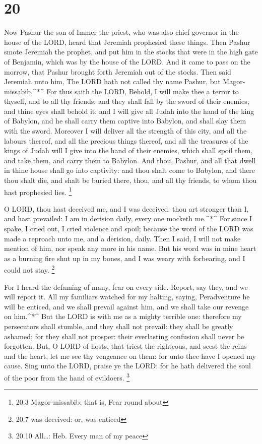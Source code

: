 \hypertarget{section-19}{%
\section{20}\label{section-19}}

 Now Pashur the son of Immer the priest, who was also chief
governor in the house of the LORD, heard that Jeremiah prophesied these
things.  Then Pashur smote Jeremiah the prophet, and put him
in the stocks that were in the high gate of Benjamin, which was by the
house of the LORD.  And it came to pass on the morrow, that
Pashur brought forth Jeremiah out of the stocks. Then said Jeremiah unto
him, The LORD hath not called thy name Pashur, but
Magor-missabib.\^{}*\^{}  For thus saith the LORD, Behold, I
will make thee a terror to thyself, and to all thy friends: and they
shall fall by the sword of their enemies, and thine eyes shall behold
it: and I will give all Judah into the hand of the king of Babylon, and
he shall carry them captive into Babylon, and shall slay them with the
sword.  Moreover I will deliver all the strength of this
city, and all the labours thereof, and all the precious things thereof,
and all the treasures of the kings of Judah will I give into the hand of
their enemies, which shall spoil them, and take them, and carry them to
Babylon.  And thou, Pashur, and all that dwell in thine
house shall go into captivity: and thou shalt come to Babylon, and there
thou shalt die, and shalt be buried there, thou, and all thy friends, to
whom thou hast prophesied lies. \footnote{20.3 Magor-missabib: that is,
  Fear round about}

 O LORD, thou hast deceived me, and I was deceived: thou art
stronger than I, and hast prevailed: I am in derision daily, every one
mocketh me.\^{}*\^{}  For since I spake, I cried out, I
cried violence and spoil; because the word of the LORD was made a
reproach unto me, and a derision, daily.  Then I said, I
will not make mention of him, nor speak any more in his name. But his
word was in mine heart as a burning fire shut up in my bones, and I was
weary with forbearing, and I could not stay. \footnote{20.7 was
  deceived: or, was enticed}

 For I heard the defaming of many, fear on every side.
Report, say they, and we will report it. All my familiars watched for my
halting, saying, Peradventure he will be enticed, and we shall prevail
against him, and we shall take our revenge on him.\^{}*\^{}
 But the LORD is with me as a mighty terrible one:
therefore my persecutors shall stumble, and they shall not prevail: they
shall be greatly ashamed; for they shall not prosper: their everlasting
confusion shall never be forgotten.  But, O LORD of hosts,
that triest the righteous, and seest the reins and the heart, let me see
thy vengeance on them: for unto thee have I opened my cause.
 Sing unto the LORD, praise ye the LORD: for he hath
delivered the soul of the poor from the hand of evildoers. \footnote{20.10
  All\ldots: Heb. Every man of my peace}

